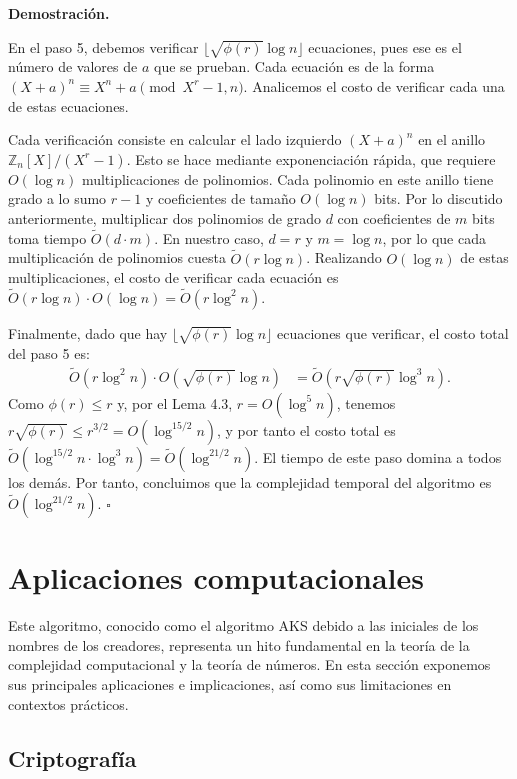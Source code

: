 \documentclass{article}
\newenvironment{dem}{\par\noindent\textbf{Demostración.}\par}{\hfill$\square$\par}
\begin{document}
\begin{dem}
En el paso 5, debemos verificar $\lfloor \sqrt{\phi(r)} \log n \rfloor$ ecuaciones, pues ese es el número de valores de $a$ que se prueban.
Cada ecuación es de la
forma $(X + a)^n \equiv X^n + a \pmod{X^r - 1, n}$. Analicemos el costo de verificar
cada una de estas ecuaciones.

Cada verificación consiste en calcular el lado izquierdo $(X+a)^n$ en el anillo
$\mathbb{Z}_n[X]/(X^r-1)$. Esto se hace mediante exponenciación rápida, que requiere
$O(\log n)$ multiplicaciones de polinomios. Cada polinomio en este anillo tiene grado
a lo sumo $r-1$ y coeficientes de tamaño $O(\log n)$ bits. Por lo discutido anteriormente,
multiplicar dos polinomios de grado $d$ con coeficientes de $m$ bits toma tiempo
$\tilde{O}(d \cdot m)$. En nuestro caso, $d = r$ y $m = \log n$, por lo que cada
multiplicación de polinomios cuesta $\tilde{O}(r \log n)$. Realizando $O(\log n)$ de
estas multiplicaciones, el costo de verificar cada ecuación es
$\tilde{O}(r \log n) \cdot O(\log n) = \tilde{O}(r \log^2 n)$.

Finalmente, dado que hay $\lfloor \sqrt{\phi(r)} \log n \rfloor$ ecuaciones que verificar,
el costo total del paso 5 es:
\begin{align*}
\tilde{O}(r \log^2 n) \cdot O\!\left(\sqrt{\phi(r)} \log n\right)
&= \tilde{O}\!\left(r \sqrt{\phi(r)} \log^3 n\right).
\end{align*}
Como $\phi(r) \leq r$ y, por el Lema 4.3, $r = O(\log^5 n)$, tenemos
$r\sqrt{\phi(r)} \leq r^{3/2} = O(\log^{15/2} n)$, y por tanto el costo total es
$\tilde{O}(\log^{15/2} n \cdot \log^3 n) = \tilde{O}(\log^{21/2} n)$.
El tiempo de este paso domina a todos los demás. Por tanto, concluimos que la complejidad temporal del
algoritmo es $\tilde{O}(\log^{21/2} n)$.
\end{dem}
\section{Aplicaciones computacionales}

Este algoritmo, conocido como el algoritmo AKS debido a las iniciales de los nombres de los creadores, representa un hito fundamental en la teoría de la complejidad
computacional y la teoría de números. En esta sección exponemos sus principales
aplicaciones e implicaciones, así como sus limitaciones en contextos prácticos.

\subsection{Criptografía}
\end{document}
